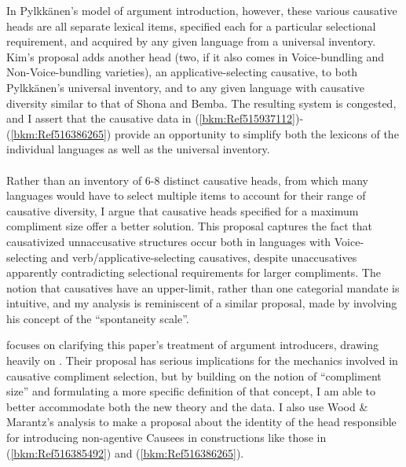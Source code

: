 \documentclass[output=paper,modfonts,nonflat]{langsci/langscibook}
\begin{document}
\begin{styleDefault}
In Pylkkänen’s model of argument introduction, however, these various causative heads are all separate lexical items, specified each for a particular selectional requirement, and acquired by any given language from a universal inventory. Kim’s proposal adds another head (two, if it also comes in Voice-bundling and Non-Voice-bundling varieties), an applicative-selecting causative, to both Pylkkänen’s universal inventory, and to any given language with causative diversity similar to that of Shona and Bemba. The resulting system is congested, and I assert that the causative data in (\ref{bkm:Ref515937112}){}-(\ref{bkm:Ref516386265}) provide an opportunity to simplify both the lexicons of the individual languages as well as the universal inventory. \\
\\
Rather than an inventory of 6-8 distinct causative heads, from which many languages would have to select multiple items to account for their range of causative diversity, I argue that causative heads specified for a maximum compliment size offer a better solution. This proposal captures the fact that causativized unnaccusative structures occur both in languages with Voice-selecting and verb/applicative-selecting causatives, despite unaccusatives apparently contradicting selectional requirements for larger compliments. The notion that causatives have an upper-limit, rather than one categorial mandate is intuitive, and my analysis is reminiscent of a similar proposal, made by \citet{Haspelmath2016} involving his concept of the “spontaneity scale”. \\\end{styleDefault}

 focuses on clarifying this paper’s treatment of argument introducers, drawing heavily on \citet{WoodMarantz2017}. Their proposal has serious implications for the mechanics involved in causative compliment selection, but by building on the notion of “compliment size” and formulating a more specific definition of that concept, I am able to better accommodate both the new theory and the data. I also use Wood \& Marantz’s analysis to make a proposal about the identity of the head responsible for introducing non-agentive Causees in constructions like those in (\ref{bkm:Ref516385492}) and (\ref{bkm:Ref516386265}).
\end{document}
